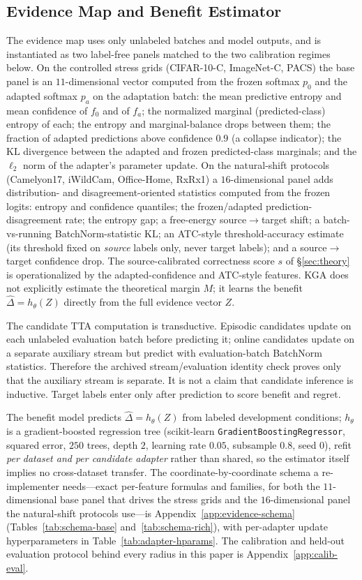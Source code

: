 \subsection{Evidence Map and Benefit Estimator}
The evidence map uses only unlabeled batches and model outputs, and is instantiated as two
label-free panels matched to the two calibration regimes below. On the controlled stress grids
(CIFAR-10-C, ImageNet-C, PACS) the base panel is an $11$-dimensional vector computed from the
frozen softmax $p_0$ and the adapted softmax $p_a$ on the adaptation batch: the mean predictive
entropy and mean confidence of $f_0$ and of $f_a$; the normalized marginal (predicted-class)
entropy of each; the entropy and marginal-balance drops between them; the fraction of adapted
predictions above confidence $0.9$ (a collapse indicator); the $\mathrm{KL}$ divergence between
the adapted and frozen predicted-class marginals; and the $\ell_2$ norm of the adapter's
parameter update. On the natural-shift protocols (Camelyon17, iWildCam, Office-Home, RxRx1) a
$16$-dimensional panel adds distribution- and disagreement-oriented statistics computed from the
frozen logits: entropy and confidence quantiles; the frozen/adapted prediction-disagreement rate;
the entropy gap; a free-energy source$\to$target shift; a batch-vs-running BatchNorm-statistic
$\mathrm{KL}$; an ATC-style threshold-accuracy estimate (its threshold fixed on \emph{source}
labels only, never target labels); and a source$\to$target confidence drop. The source-calibrated
correctness score $s$ of \S\ref{sec:theory} is operationalized by the adapted-confidence and
ATC-style features. \textsc{KGA} does not explicitly estimate the theoretical margin $M$; it learns the benefit $\widehat\Delta=h_\theta(Z)$ directly from the full evidence vector $Z$.

The candidate TTA computation is transductive. Episodic candidates update on each unlabeled
evaluation batch before predicting it; online candidates update on a separate auxiliary stream but
predict with evaluation-batch BatchNorm statistics. Therefore the archived stream/evaluation
identity check proves only that the auxiliary stream is separate. It is not a claim that candidate
inference is inductive. Target labels enter only after prediction to score benefit and regret.

The benefit model predicts $\widehat\Delta=h_\theta(Z)$ from labeled development conditions;
$h_\theta$ is a gradient-boosted regression tree (scikit-learn
\texttt{GradientBoostingRegressor}, squared error, $250$ trees, depth $2$, learning rate $0.05$,
subsample $0.8$, seed $0$), refit \emph{per dataset and per candidate adapter} rather than shared,
so the estimator itself implies no cross-dataset transfer.
The coordinate-by-coordinate schema a re-implementer needs---exact per-feature formulas and
families, for both the $11$-dimensional base panel that drives the stress grids and the
$16$-dimensional panel the natural-shift protocols use---is
Appendix~\ref{app:evidence-schema} (Tables~\ref{tab:schema-base} and~\ref{tab:schema-rich}), with
per-adapter update hyperparameters in Table~\ref{tab:adapter-hparams}. The calibration and
held-out evaluation protocol behind every radius in this paper is Appendix~\ref{app:calib-eval}.

